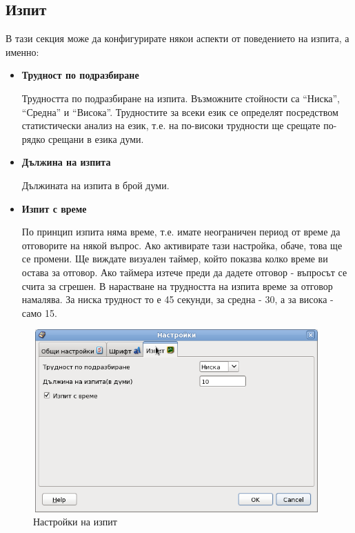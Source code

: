 \subsection{Изпит}

В тази секция може да конфигурирате някои аспекти от поведението на
изпита, а именно:

\begin{itemize}
  \item \textbf{Трудност по подразбиране}

    Трудността по подразбиране на изпита. Възможните стойности са
    "`Ниска"', "`Средна"' и "`Висока"'. Трудностите за всеки език се
    определят посредством статистически анализ на език, т.е. на
    по-високи трудности ще срещате по-рядко срещани в езика думи.

  \item \textbf{Дължина на изпита}

    Дължината на изпита в брой думи.

  \item \textbf{Изпит с време}

    По принцип изпита няма време, т.е. имате неограничен период от
    време да отговорите на някой въпрос. Ако активирате тази
    настройка, обаче, това ще се промени. Ще виждате визуален таймер,
    който показва колко време ви остава за отговор. Ако таймера изтече
    преди да дадете отговор - въпросът се счита за сгрешен. В
    нарастване на трудността на изпита време за отговор намалява. За
    ниска трудност то е 45 секунди, за средна - 30, а за висока - само
    15.
\end{itemize}

\begin{figure}[htbp]
  \caption{Настройки на изпит}
  \centering
  \includegraphics[width=110mm, height=70mm]{images/exam_preferences.png}
\end{figure}

